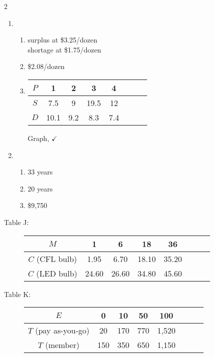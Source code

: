 \begin{multicols} {2}
\begin{enumerate}
\item %
\begin{enumerate}
\item surplus at \$3.25/dozen \\ shortage at \$1.75/dozen
\item \$2.08/dozen
\item \begin{tabular} {|c| |c|c |c|c |c|c |c|}\hline
$P$ & 1 & 2 & 3 & 4 \\ \hline
$S$ & 7.5 & 9 & 19.5 & 12 \\ \hline
$D$ & 10.1 & 9.2 & 8.3 & 7.4 \\ \hline
\end{tabular}

Graph, $\checkmark$
\end{enumerate}

\item %
\begin{enumerate}
\item 33 years 
\item 20 years
\item \$9,750
\end{enumerate}

\end{enumerate}
\end{multicols}

\bigskip

\begin{description}
\item[\quad Table J: \quad] 
\begin{tabular} {|c| |c|c |c|c |c|c |c|}\hline
$M$ & 1 & 6 & 18 & 36 \\ \hline
$C$ (CFL bulb) & 1.95 & 6.70 & 18.10 & 35.20\\ \hline
$C$ (LED bulb) & 24.60 & 26.60 & 34.80 & 45.60 \\ \hline
\end{tabular}
\end{description}

\begin{description}
\item[\quad Table K: \quad] 
\begin{tabular} {|c| |c|c |c|c |c|c |c|}\hline
$E$ & 0 & 10 & 50 & 100 \\ \hline
$T$ (pay as-you-go) & 20 & 170& 770 & 1,520   \\ \hline
$T$ (member) & 150 & 350 & 650 & 1,150 \\ \hline
\end{tabular} 
\end{description}

